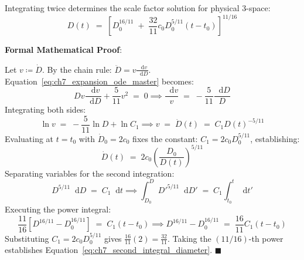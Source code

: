 \documentclass[
    12pt,
    a4paper,
    headings=normal,
    twoside=false,
    open=any,
    parskip=half
]{scrbook}
\newcommand{\diff}{\mathop{}\!\mathrm{d}}
\newenvironment{myproof}[1][]{%
  \par\vspace{6pt}\noindent\textbf{\sffamily\color{maincolor}Formal Mathematical Proof\ifstrempty{#1}{}{ (#1)}}:\par\nopagebreak
}{%
  \penalty50\hfill\ensuremath{\blacksquare}\par\vspace{6pt}
}
\begin{document}
Integrating twice determines the scale factor solution for physical 3-space:
\begin{equation}
\boxed{D(t) \;=\; \left[ D_0^{16/11} \;+\; \frac{32}{11} c_0 D_0^{5/11} \left( t - t_0 \right) \right]^{11/16}}
\label{eq:ch7_second_integral_diameter}
\end{equation}

\begin{myproof}
Let $v \coloneqq \dot{D}$. By the chain rule: $\ddot{D} = v \frac{\diff v}{\diff D}$. Equation~\eqref{eq:ch7_expansion_ode_master} becomes:
\begin{equation*}
D v \frac{\diff v}{\diff D} + \frac{5}{11} v^2 \;=\; 0 \implies \frac{\diff v}{v} \;=\; -\frac{5}{11} \frac{\diff D}{D}
\end{equation*}
Integrating both sides:
\begin{equation*}
\ln v \;=\; -\frac{5}{11} \ln D + \ln C_1 \implies v \;=\; \dot{D}(t) \;=\; C_1 D(t)^{-5/11}
\end{equation*}
Evaluating at $t = t_0$ with $\dot{D}_0 = 2c_0$ fixes the constant: $C_1 = 2c_0 D_0^{5/11}$, establishing:
\begin{equation}
\dot{D}(t) \;=\; 2 c_0 \left( \frac{D_0}{D(t)} \right)^{5/11}
\label{eq:ch7_first_integral_velocity}
\end{equation}
Separating variables for the second integration:
\begin{equation*}
D^{5/11} \diff D \;=\; C_1 \diff t \implies \int_{D_0}^D D'^{5/11} \diff D' \;=\; C_1 \int_{t_0}^t \diff t'
\end{equation*}
Executing the power integral:
\begin{equation*}
\frac{11}{16} \left[ D^{16/11} - D_0^{16/11} \right] \;=\; C_1 (t - t_0) \implies D^{16/11} - D_0^{16/11} \;=\; \frac{16}{11} C_1 (t - t_0)
\end{equation*}
Substituting $C_1 = 2c_0 D_0^{5/11}$ gives $\frac{16}{11}(2) = \frac{32}{11}$. Taking the $(11/16)$-th power establishes Equation~\eqref{eq:ch7_second_integral_diameter}.
\end{myproof}
\end{document}
